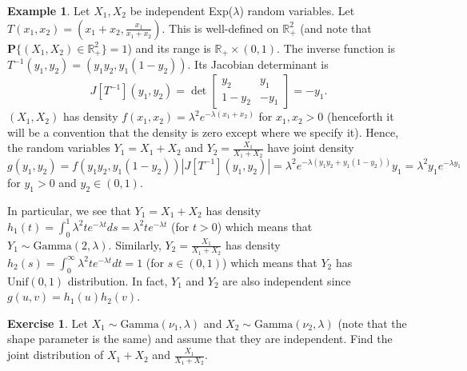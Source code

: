 \documentclass[preprint,  11pt]{amsart}
\theoremstyle{plain} %
\theoremstyle{definition} %
\newtheorem{exercise}[theorem]{Exercise}
\newtheorem{example}[theorem]{Example}
\begin{document}
\begin{example} Let $X_{1},X_{2}$ be independent Exp($\lambda$) random variables. Let $T(x_{1},x_{2})=(x_{1}+x_{2},\frac{x_{1}}{x_{1}+x_{2}})$. This is well-defined on $\mathbb{R}_{+}^{2}$ (and note that $\mathbf{P}\{(X_{1},X_{2})\in \mathbb{R}_{+}^{2}\}=1$) and its range is $\mathbb{R}_{+}\times (0,1)$. The inverse function is $T^{-1}(y_{1},y_{2})=(y_{1}y_{2},y_{1}(1-y_{2}))$. Its Jacobian determinant is
$$
J[T^{-1}](y_{1},y_{2})=\det\left[\begin{array}{cc}y_{2} & y_{1}\\ 1-y_{2} & -y_{1} \end{array}\right]=-y_{1}.
$$
$(X_{1},X_{2})$ has density $f(x_{1},x_{2})=\lambda^{2}e^{-\lambda(x_{1}+x_{2})}$ for $x_{1},x_{2}>0$ (henceforth it will be a convention that the density is zero except where we specify it).
Hence, the random variables $Y_{1}=X_{1}+X_{2}$ and $Y_{2}=\frac{X_{1}}{X_{1}+X_{2}}$ have joint density
$$
g(y_{1},y_{2})=f(y_{1}y_{2},y_{1}(1-y_{2}))|J[T^{-1}](y_{1},y_{2})| = \lambda^{2}e^{-\lambda(y_{1}y_{2}+y_{1}(1-y_{2}))}y_{1}=\lambda^{2}y_{1}e^{-\lambda y_{1}}
$$
for $y_{1}>0$ and $y_{2}\in (0,1)$. 

In particular, we see that $Y_{1}=X_{1}+X_{2}$ has density $h_{1}(t)=\int_{0}^{1}\lambda^{2}te^{-\lambda t}ds = \lambda^{2}te^{-\lambda t}$ (for $t>0$)  which means that $Y_{1}\sim \mbox{Gamma}(2,\lambda)$. Similarly, $Y_{2}=\frac{X_{1}}{X_{1}+X_{2}}$ has density $h_{2}(s)=\int_{0}^{\infty} \lambda^{2}t e^{-\lambda t}dt =1$ (for $s\in (0,1)$) which means that $Y_{2}$ has $\mbox{Unif}(0,1)$ distribution. In fact, $Y_{1}$ and $Y_{2}$ are also independent since $g(u,v)=h_{1}(u)h_{2}(v)$.
\end{example}

\begin{exercise} Let $X_{1}\sim \mbox{Gamma}(\nu_{1},\lambda)$ and $X_{2}\sim \mbox{Gamma}(\nu_{2},\lambda)$ (note that the shape parameter is the same) and assume that they are independent. Find the joint distribution of $X_{1}+X_{2}$ and $\frac{X_{1}}{X_{1}+X_{2}}$.
\end{exercise}
\end{document}

